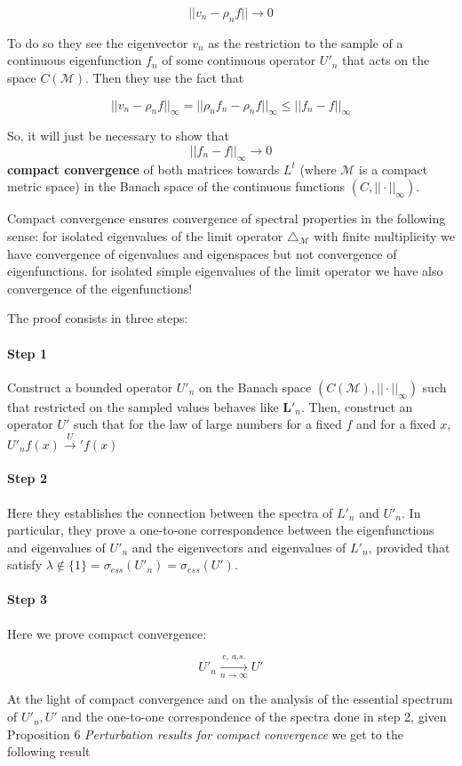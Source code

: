 $$||v_n-\rho_nf||\rightarrow 0$$

To do so they see the eigenvector $v_n$ as the restriction to the sample of a continuous eigenfunction $f_n$ of some continuous operator $U'_n$ that acts on the space $C(\mathcal M)$. Then they use the fact that 

$$||v_n-\rho_nf||_\infty = ||\rho_nf_n-\rho_nf||_\infty\leq ||f_n-f||_\infty$$


So, it will just be necessary to show that  $$||f_n-f||_\infty\rightarrow 0$$
 \textbf{compact convergence} of both matrices towards $L^t$ (where $\mathcal M$ is a compact metric space) in the Banach space of the continuous functions $(C, ||\cdot||_\infty)$. 

Compact convergence ensures convergence of spectral properties in the following sense: for isolated eigenvalues of the limit operator $\triangle_\mathcal M$ with finite multiplicity we have convergence of eigenvalues and eigenspaces but not convergence of eigenfunctions. for isolated simple eigenvalues of the limit operator we have also convergence of the eigenfunctions!

The proof consists in three steps:
\paragraph{Step 1} Construct a bounded operator $U'_n$ on the Banach space $(C(\mathcal M), ||\cdot||_\infty)$ such that restricted on the sampled values behaves like $\mathbf{L}'_n$. Then, construct an operator $U'$ such that for the law of large numbers for a fixed $f$ and for a fixed $x$, $U'_nf(x) \xrightarrow U'f(x) $
\paragraph{Step 2} Here they establishes the connection between the spectra of $L'_n$ and $U'_n$. In particular, they prove a one-to-one correspondence between the eigenfunctions and eigenvalues of $U'_n$ and the eigenvectors and eigenvalues of $L'_n$, provided that satisfy $\lambda\notin \{1\}=\sigma_{ess}(U'_n)= \sigma_{ess}(U')$.
\paragraph{Step 3} Here we prove compact convergence:

$$U'_n \xrightarrow[n\to\infty]{c,\ a.s.}U'$$

At the light of compact convergence and on the analysis of the essential spectrum of $U'_n, U'$ and the one-to-one correspondence of the spectra done in step 2, given Proposition 6 \textit{Perturbation results for compact convergence} we get to the following result

